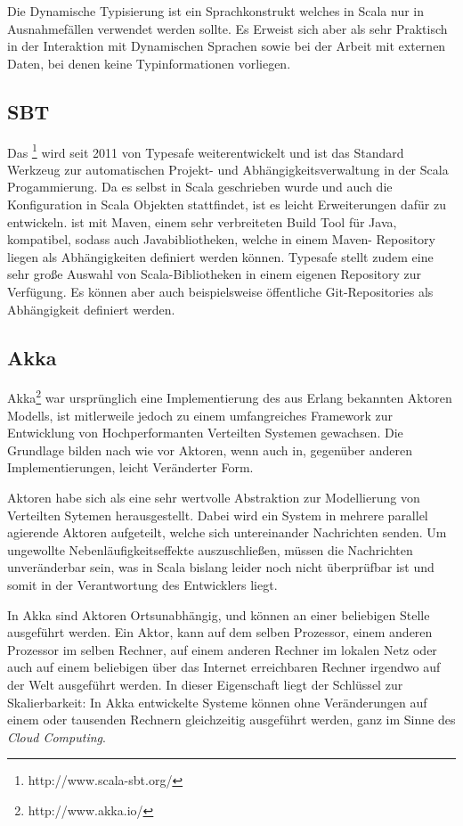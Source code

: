 Die Dynamische Typisierung ist ein Sprachkonstrukt welches in Scala nur in Ausnahmefällen verwendet
werden sollte. Es Erweist sich aber als sehr Praktisch in der Interaktion mit Dynamischen Sprachen
sowie bei der Arbeit mit externen Daten, bei denen keine Typinformationen vorliegen.

\subsection{SBT}
\label{sec:sbt}

Das \footnote{http://www.scala-sbt.org/} wird seit 2011 von Typesafe weiterentwickelt und
ist das Standard Werkzeug zur automatischen Projekt- und Abhängigkeitsverwaltung in der Scala
Progammierung. Da es selbst in Scala geschrieben wurde und auch die Konfiguration in Scala Objekten
stattfindet, ist es leicht Erweiterungen dafür zu entwickeln.  ist mit Maven, einem sehr
verbreiteten Build Tool für Java, kompatibel, sodass auch Javabibliotheken, welche in einem Maven-
Repository liegen als Abhängigkeiten definiert werden können. Typesafe stellt zudem eine sehr große
Auswahl von Scala-Bibliotheken in einem eigenen Repository zur Verfügung. Es können aber auch
beispielsweise öffentliche Git-Repositories als Abhängigkeit definiert werden.

\subsection{Akka}
\label{sec:akka}

Akka\footnote{http://www.akka.io/} war ursprünglich eine Implementierung des aus Erlang bekannten
Aktoren Modells, ist mitlerweile jedoch zu einem umfangreiches Framework zur Entwicklung von
Hochperformanten Verteilten Systemen gewachsen. Die Grundlage bilden nach wie vor Aktoren, wenn auch
in, gegenüber anderen Implementierungen, leicht Veränderter Form. \cite{actors}

Aktoren habe sich als eine sehr wertvolle Abstraktion zur Modellierung von Verteilten Sytemen
herausgestellt. Dabei wird ein System in mehrere parallel agierende Aktoren aufgeteilt, welche sich
untereinander Nachrichten senden. Um ungewollte Nebenläufigkeitseffekte auszuschließen, müssen die
Nachrichten unveränderbar sein, was in Scala bislang leider noch nicht überprüfbar ist und somit in
der Verantwortung des Entwicklers liegt.

In Akka sind Aktoren Ortsunabhängig, und können an einer beliebigen Stelle ausgeführt werden. Ein
Aktor, kann auf dem selben Prozessor, einem anderen Prozessor im selben Rechner, auf einem anderen
Rechner im lokalen Netz oder auch auf einem beliebigen über das Internet erreichbaren Rechner
irgendwo auf der Welt ausgeführt werden. In dieser Eigenschaft liegt der Schlüssel zur
Skalierbarkeit: In Akka entwickelte Systeme können ohne Veränderungen auf einem oder tausenden
Rechnern gleichzeitig ausgeführt werden, ganz im Sinne des \textit{Cloud Computing}.

